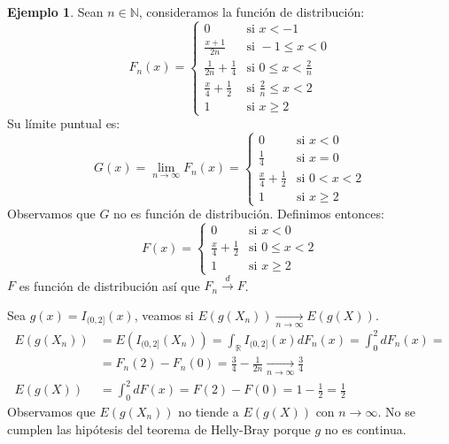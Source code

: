 \documentclass{report}
\theoremstyle{remark}
\theoremstyle{remark}
\theoremstyle{remark}
\theoremstyle{definition}
\theoremstyle{definition}
\theoremstyle{definition}
\newtheorem*{example}{Ejemplo}
\theoremstyle{definition}
\begin{document}
\begin{example}
    Sean $n \in \mathbb{N}$, consideramos la función de distribución:
    $$F_n(x) = \begin{cases}
            0                          & \text{si } x < -1                 \\
            \frac{x+1}{2n}             & \text{si } -1 \leq x < 0          \\
            \frac{1}{2n} + \frac{1}{4} & \text{si } 0 \leq x < \frac{2}{n} \\
            \frac{x}{4} + \frac{1}{2}  & \text{si } \frac{2}{n} \leq x < 2 \\
            1                          & \text{si } x \geq 2
        \end{cases}$$
    Su límite puntual es:
    $$G(x) = \lim\limits_{n \to \infty} F_n(x) = \begin{cases}
            0                         & \text{si } x < 0     \\
            \frac{1}{4}               & \text{si } x = 0     \\
            \frac{x}{4} + \frac{1}{2} & \text{si } 0 < x < 2 \\
            1                         & \text{si } x \geq 2
        \end{cases}$$
    Observamos que $G$ no es función de distribución.
    Definimos entonces:
    $$F(x) = \begin{cases}
            0                         & \text{si } x < 0        \\
            \frac{x}{4} + \frac{1}{2} & \text{si } 0 \leq x < 2 \\
            1                         & \text{si } x \geq 2
        \end{cases}$$
    $F$ es función de distribución así que $F_n \xrightarrow{d} F$.

    Sea $g(x) = I_{(0,2]}(x)$, veamos si $E(g(X_n)) \xrightarrow[n \to \infty]{} E(g(X))$.
    \begin{align*}
        E(g(X_n)) & = E(I_{(0,2]}(X_n)) = \int_\mathbb{R} I_{(0,2]}(x) dF_n(x) = \int_0^2 dF_n(x) =         \\
                  & = F_n(2) - F_n(0) = \frac{3}{4} - \frac{1}{2n} \xrightarrow[n \to \infty]{} \frac{3}{4} \\
        E(g(X))   & = \int_0^2 dF(x) = F(2) - F(0) = 1 - \frac{1}{2} = \frac{1}{2}
    \end{align*}
    Observamos que $E(g(X_n))$ no tiende a $E(g(X))$ con $n \to \infty$.
    No se cumplen las hipótesis del teorema de Helly-Bray porque $g$ no es continua.


\end{example}
\end{document}

